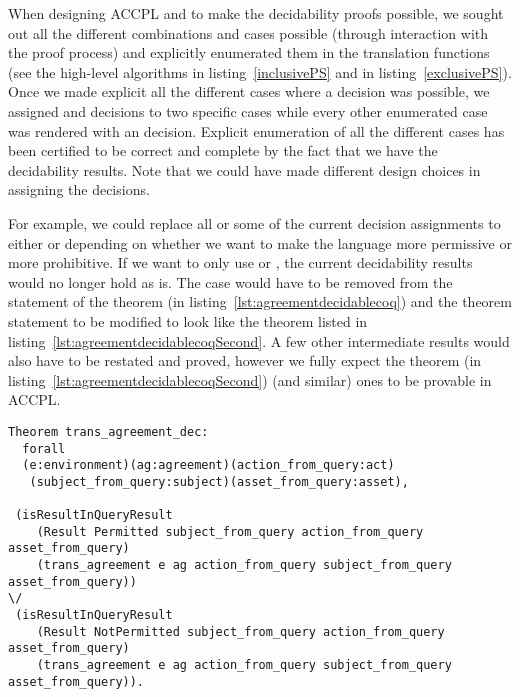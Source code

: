 When designing \ac{ACCPL} and to make the decidability proofs possible, we sought out all the different combinations and cases possible (through interaction with the proof process) and explicitly enumerated them in the translation functions (see the high-level algorithms in listing~\ref{inclusivePS} and in listing~\ref{exclusivePS}). Once we made explicit all the different cases where a decision was possible, we assigned  and  decisions to two specific cases while every other enumerated case was rendered with an  decision. Explicit enumeration of all the different cases has been certified to be correct and complete by the fact that we have the decidability results. Note that we could have made different design choices in assigning the decisions. 

For example, we could replace all or some of the current  decision assignments to either  or  depending on whether we want to make the language more permissive or more prohibitive. If we want to only use  or , the current decidability results would no longer hold as is. The  case would have to be removed from the statement of the theorem  (in listing~\ref{lst:agreementdecidablecoq}) and the theorem statement to be modified to look like the theorem listed in listing~\ref{lst:agreementdecidablecoqSecond}. A few other intermediate results would also have to be restated and proved, however we fully expect the theorem (in listing~\ref{lst:agreementdecidablecoqSecond}) (and similar) ones to be provable in \ac{ACCPL}.

\begin{minipage}[c]{0.95\textwidth}
\begin{lstlisting}
Theorem trans_agreement_dec:
  forall
  (e:environment)(ag:agreement)(action_from_query:act)
   (subject_from_query:subject)(asset_from_query:asset),

 (isResultInQueryResult 
    (Result Permitted subject_from_query action_from_query asset_from_query)
    (trans_agreement e ag action_from_query subject_from_query asset_from_query)) 
\/
 (isResultInQueryResult 
    (Result NotPermitted subject_from_query action_from_query asset_from_query)
    (trans_agreement e ag action_from_query subject_from_query asset_from_query)).

\end{lstlisting}
\end{minipage}


